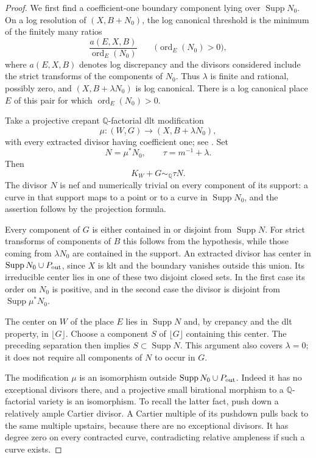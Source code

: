 \begin{proof}
We first find a coefficient-one boundary component lying over
$\operatorname{Supp}N_0$.  On a log resolution of $(X,B+N_0)$, the log
canonical threshold is the minimum of the finitely many ratios
\[
  \frac{a(E,X,B)}{\operatorname{ord}_E(N_0)}
  \qquad\bigl(\operatorname{ord}_E(N_0)>0\bigr),
\]
where $a(E,X,B)$ denotes log discrepancy and the divisors considered
include the strict transforms of the components of $N_0$.
Thus $\lambda$ is finite and rational, possibly zero, and
$(X,B+\lambda N_0)$ is log canonical.  There is a log canonical place
$E$ of this pair for which $\operatorname{ord}_E(N_0)>0$.

Take a projective crepant $\mathbb Q$-factorial dlt modification
\[
  \mu:(W,G)\longrightarrow (X,B+\lambda N_0),
\]
with every extracted divisor having coefficient one; see
\cite[Theorem~2.27]{XuNuTwo}.  Set
\[
  N=\mu^*N_0,\qquad \tau=m^{-1}+\lambda.
\]
Then
\begin{equation}\label{eq:isolation-restored}
  K_W+G\sim_{\mathbb Q}\tau N.
\end{equation}
The divisor $N$ is nef and numerically trivial on every component of
its support: a curve in that support maps to a point or to a curve in
$\operatorname{Supp}N_0$, and the assertion follows by the projection
formula.

Every component of $G$ is either contained in or disjoint from
$\operatorname{Supp}N$.  For strict transforms of components of $B$
this follows from the hypothesis, while those coming from
$\lambda N_0$ are contained in the support.  An extracted divisor has center in
$\operatorname{Supp}N_0\cup P_{\rm out}$, since $X$ is klt and the
boundary vanishes outside this union.  Its irreducible center lies in
one of these two disjoint closed sets.  In the first case its order
on $N_0$ is positive, and in the second case the divisor is disjoint
from $\operatorname{Supp}\mu^*N_0$.

The center on $W$ of the place $E$ lies in $\operatorname{Supp}N$ and,
by crepancy and the dlt property, in $\lfloor G\rfloor$.  Choose a
component $S$ of $\lfloor G\rfloor$ containing this center.
The preceding separation then implies
$S\subset\operatorname{Supp}N$.  This argument also covers
$\lambda=0$; it does not require all components of $N$ to occur in
$G$.

The modification $\mu$ is an isomorphism outside
$\operatorname{Supp}N_0\cup P_{\rm out}$.  Indeed it has no exceptional
divisors there, and a projective small birational morphism to a
$\mathbb Q$-factorial variety is an isomorphism.  To recall the latter
fact, push down a relatively ample Cartier divisor.  A Cartier
multiple of its pushdown pulls back to the same multiple upstairs,
because there are no exceptional divisors.  It has degree zero on
every contracted curve, contradicting relative ampleness if such a
curve exists.


\end{proof}
